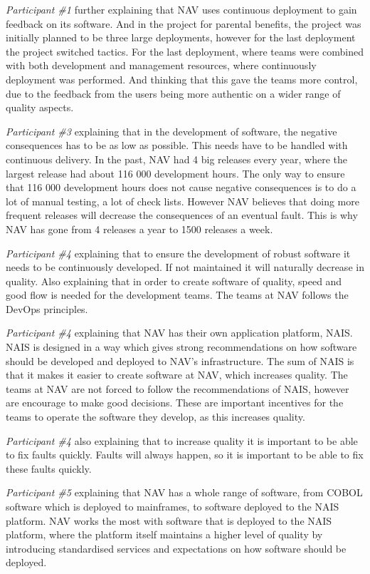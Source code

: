 \textit{Participant \#1} further explaining that NAV uses continuous deployment to gain feedback on its software. And in the project for parental benefits, the project was initially planned to be three large deployments, however for the last deployment the project switched tactics. For the last deployment, where teams were combined with both development and management resources, where continuously deployment was performed. And thinking that this gave the teams more control, due to the feedback from the users being more authentic on a wider range of quality aspects.

\textit{Participant \#3} explaining that in the development of software, the negative consequences has to be as low as possible. This needs have to be handled with continuous delivery. In the past, NAV had 4 big releases every year, where the largest release had about 116 000 development hours. The only way to ensure that 116 000 development hours does not cause negative consequences is to do 
 a lot of manual testing, a lot of check lists. However NAV believes that doing more frequent releases will decrease the consequences of an eventual fault. This is why NAV has gone from 4 releases a year to 1500 releases a week.

\textit{Participant \#4} explaining that to ensure the development of robust software it needs to be continuously developed. If not maintained it will naturally decrease in quality. Also explaining that in order to create software of quality, speed and good flow is needed for the development teams. The teams at NAV follows the DevOps principles.

\textit{Participant \#4} explaining that NAV has their own application platform, NAIS. NAIS is designed in a way which gives strong recommendations on how software should be developed and deployed to NAV's infrastructure. The sum of NAIS is that it makes it easier to create software at NAV, which increases quality. The teams at NAV are not forced to follow the recommendations of NAIS, however are encourage to make good decisions. These are important incentives for the teams to operate the software they develop, as this increases quality.

\textit{Participant \#4} also explaining that to increase quality it is important to be able to fix faults quickly. Faults will always happen, so it is important to be able to fix these faults quickly.

\textit{Participant \#5} explaining that NAV has a whole range of software, from COBOL software which is deployed to mainframes, to software deployed to the NAIS platform. NAV works the most with software that is deployed to the NAIS platform, where the platform itself maintains a higher level of quality by introducing standardised services and expectations on how software should be deployed.

